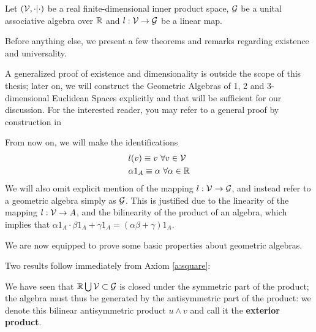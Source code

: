 Let $(\mathcal{V}, \cdot|\cdot )$ be a real finite-dimensional inner product space, $\mathcal{G}$ be a unital associative algebra over $\mathbb{R}$ and $l: \mathcal{V} \to \mathcal{G}$ be a linear map.



Before anything else, we present a few theorems and remarks regarding existence and universality.




A generalized proof of existence and dimensionality is outside the scope of this thesis; later on, we will construct the Geometric Algebras of 1, 2 and 3-dimensional Euclidean Spaces explicitly and that will be sufficient for our discussion. For the interested reader, you may refer to a general proof by construction in \cite[Section 3.2]{clifford-algebra}

\begin{remark}
	From now on, we will make the identifications
	\begin{align*}
		&l(v) \equiv v \ \forall v \in \mathcal{V} \\
		&\alpha 1_A \equiv \alpha \ \forall \alpha \in \mathbb{R}
	\end{align*}
	We will also omit explicit mention of the mapping $l: \mathcal{V} \to \mathcal{G}$, and instead refer to a geometric algebra simply as $\mathcal{G}$. This is justified due to the linearity of the mapping $l: \mathcal{V} \to A$, and the bilinearity of the product of an algebra, which implies that $\alpha 1_A \cdot \beta 1_A  + \gamma 1_A = (\alpha \beta + \gamma) 1_A$.
\end{remark}

We are now equipped to prove some basic properties about geometric algebras.

Two results follow immediately from Axiom \ref{a:square}:





\begin{remark}
	We have seen that $\mathbb{R} \bigcup \mathcal{V} \subset \mathcal{G}$ is closed under the symmetric part of the product; the algebra must thus be generated by the antisymmetric part of the product: we denote this bilinear antisymmetric product $u \wedge v$ and call it the \textbf{exterior product}.
\end{remark}
%
%
%

